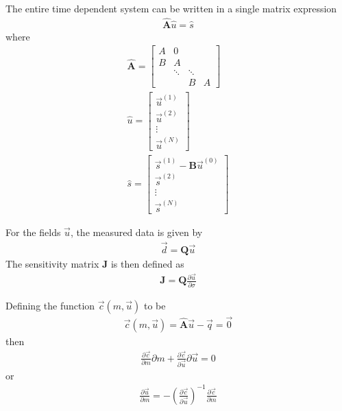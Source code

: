 \documentclass[]{article}
\newcommand{\s}{\vec{s}}
\renewcommand {\u}  { {\vec u} }
\begin{document}
The entire time dependent system can be written in a single matrix expression
\begin{align}
    \hat{\mathbf{A}} \hat{u} = \hat{s}
\end{align}
where
\begin{subequations}
    \begin{align}
        \mathbf{\hat{A}} = \left[
        \begin{array}{cccc}
            A & 0 & & \\
            B & A & & \\
              & \ddots & \ddots & \\
              & & B & A
        \end{array}
        \right] \\
        \hat{u} = \left[
            \begin{array}{c}
                \u^{(1)} \\
                \u^{(2)} \\
                \vdots \\
                \u^{(N)}
            \end{array} \right]\\
        \hat{s} = \left[
            \begin{array}{c}
                \s^{(1)} - \mathbf{B} \u^{(0)} \\
                \s^{(2)} \\
                \vdots \\
                \s^{(N)}
            \end{array}
        \right]
    \end{align}
\end{subequations}

For the fields $\u$, the measured data is given by
\begin{align}
    \vec{d} = \mathbf{Q} \u
\end{align}
The sensitivity matrix $\mathbf{J}$ is then defined as
\begin{align}
    \mathbf{J} = \mathbf{Q} \frac{\partial \u}{\partial \sigma}
\end{align}


Defining the function $\vec{c}(m,\vec{u})$ to be
\begin{align}
    \vec{c}(m,\u) = \hat{\mathbf{A}} \vec{u} - \vec{q} = \vec{0}
\end{align}
then
\begin{align}
    \frac{\partial \vec{c}}{\partial m} \partial m 
    + \frac{\partial \vec{c}}{\partial \u} \partial \vec{u} = 0
\end{align}
or
\begin{align}
    \frac{\partial \vec{u}}{\partial m} = -\left(\frac{\partial \vec{c}}{\partial \u} \right)^{-1} \frac{\partial \vec{c}}{\partial m}
\end{align}
\end{document}

